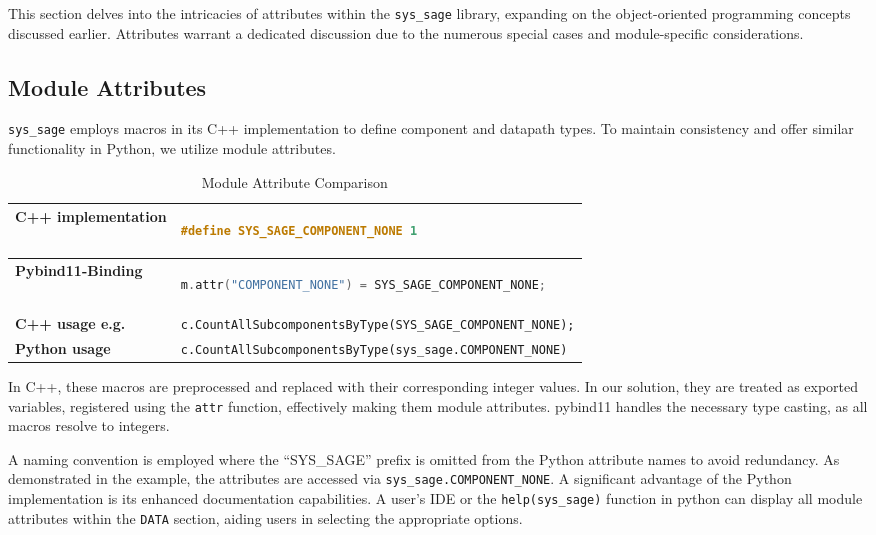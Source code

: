 This section delves into the intricacies of attributes within the \verb|sys_sage| library, expanding on the object-oriented programming concepts discussed earlier. Attributes warrant a dedicated discussion due to the numerous special cases and module-specific considerations.

\subsection{Module Attributes}

\verb|sys_sage| employs macros in its C++ implementation to define component and datapath types. To maintain consistency and offer similar functionality in Python, we utilize module attributes. 

\begin{table}[htbp]
\centering
\begin{tabular}{|l|l|}
\hline
\textbf{C++ implementation} & \begin{lstlisting}[language=C++]
#define SYS_SAGE_COMPONENT_NONE 1 
\end{lstlisting} \\ \hline
\textbf{Pybind11-Binding} & \begin{lstlisting}[language=C++]
m.attr("COMPONENT_NONE") = SYS_SAGE_COMPONENT_NONE;
\end{lstlisting} \\ \hline
\textbf{C++ usage e.g.} & \verb|c.CountAllSubcomponentsByType(SYS_SAGE_COMPONENT_NONE);| \\ \hline
\textbf{Python usage} & \verb|c.CountAllSubcomponentsByType(sys_sage.COMPONENT_NONE)| \\ \hline
\end{tabular}
\caption{Module Attribute Comparison}
\label{tab:module_attributes}
\end{table}

In C++, these macros are preprocessed and replaced with their corresponding integer values. In our solution, they are treated as exported variables, registered using the \verb|attr| function, effectively making them module attributes. pybind11 handles the necessary type casting, as all macros resolve to integers.\cite[see The Basics/First Steps]{pybind11-docu}

A naming convention is employed where the “SYS\_SAGE” prefix is omitted from the Python attribute names to avoid redundancy. As demonstrated in the example, the attributes are accessed via \verb|sys_sage.COMPONENT_NONE|.
A significant advantage of the Python implementation is its enhanced documentation capabilities. A user's \ac{IDE} or the \verb|help(sys_sage)| function in python can display all module attributes within the \verb|DATA| section, aiding users in selecting the appropriate options.

